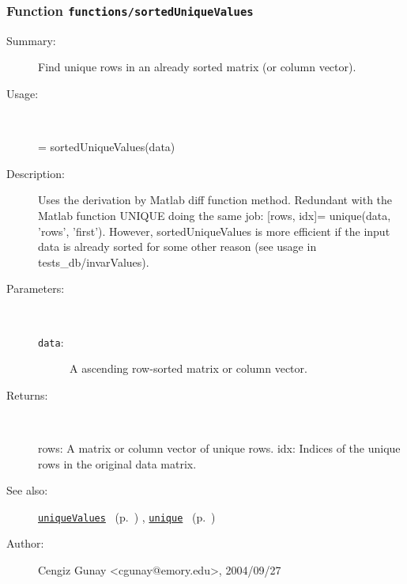 \subsubsection[Function \texttt{sortedUniqueValues}]{Function \texttt{functions/sortedUniqueValues}}%
%
\label{ref_functions__sortedUniqueValues}%
\hypertarget{ref_functions__sortedUniqueValues}{}%
\begin{description}
\item[Summary:]Find unique rows in an already sorted matrix (or column vector).
%
\item[Usage:]~%
\begin{lyxcode}%
[rows, idx] = sortedUniqueValues(data)
%
\end{lyxcode}%
%
\item[Description:]%
Uses the derivation by Matlab diff function method.  Redundant with the
 Matlab function UNIQUE doing the same job:
 [rows, idx]= unique(data, 'rows', 'first'). 
 However, sortedUniqueValues is more efficient if the input data is already
 sorted for some other reason (see usage in tests\_db/invarValues).
\item[Parameters:]~
\begin{description}%
\item[\texttt{data}:]
 A ascending row-sorted matrix or column vector.
\end{description}%
%
\item[Returns:
]~

   rows: A matrix or column vector of unique rows.
   idx: Indices of the unique rows in the original data matrix.
%
%
\item[See also:]%
\hyperlink{ref_uniqueValues}{\texttt{uniqueValues}}%
\ (p.~\pageref{ref_uniqueValues})%
%
, \hyperlink{ref_unique}{\texttt{unique}}%
\ (p.~\pageref{ref_unique})%
%
%
\item[Author:]%
Cengiz Gunay <cgunay@emory.edu>, 2004/09/27
%
\end{description}
\methodline%
